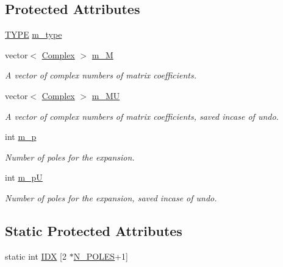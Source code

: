 \subsection*{Protected Attributes}
\begin{DoxyCompactItemize}
\item 
\hyperlink{classCMCoeff_a0b490eeb5ba86bc1a95ea1c3b2946478}{T\-Y\-P\-E} \hyperlink{classCMCoeff_afe0cd2c61d33f32a058302fb53c33ccf}{m\-\_\-type}
\item 
vector$<$ \hyperlink{util_8h_a0ef19d29521fc1e3356ea268ba175cfc}{Complex} $>$ \hyperlink{classCMCoeff_a15347641cc66b95ff56bea89f4585edf}{m\-\_\-\-M}
\begin{DoxyCompactList}\small\item\em A vector of complex numbers of matrix coefficients. \end{DoxyCompactList}\item 
vector$<$ \hyperlink{util_8h_a0ef19d29521fc1e3356ea268ba175cfc}{Complex} $>$ \hyperlink{classCMCoeff_a2fc4617b2a37d2ca033aea2f5e02b5de}{m\-\_\-\-M\-U}
\begin{DoxyCompactList}\small\item\em A vector of complex numbers of matrix coefficients, saved incase of undo. \end{DoxyCompactList}\item 
int \hyperlink{classCMCoeff_adf49f0bd55b7c496b887f547695aba38}{m\-\_\-p}
\begin{DoxyCompactList}\small\item\em Number of poles for the expansion. \end{DoxyCompactList}\item 
int \hyperlink{classCMCoeff_ac00d5938d669575bf71826ee725ccf46}{m\-\_\-p\-U}
\begin{DoxyCompactList}\small\item\em Number of poles for the expansion, saved incase of undo. \end{DoxyCompactList}\end{DoxyCompactItemize}
\subsection*{Static Protected Attributes}
\begin{DoxyCompactItemize}
\item 
static int \hyperlink{classCMCoeff_ab1882e6a0df777b1acffadf55844dc92}{I\-D\-X} \mbox{[}2 $\ast$\hyperlink{mcoeff_8h_ac23f9c13c5d07d9ce386f7a830c35e5a}{N\-\_\-\-P\-O\-L\-E\-S}+1\mbox{]}
\end{DoxyCompactItemize}
